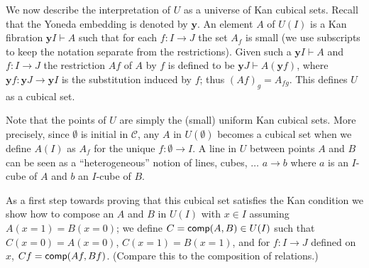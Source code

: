 \documentclass[10pt,a4paper]{article}
\newcommand{\CC}{{\mathcal C}}
\newcommand{\comp}{{\sf comp}}
\newcommand{\es}{\emptyset}
\newcommand{\rup}[1]{#1{\uparrow}}
\newcommand{\rdo}[1]{#1{\downarrow}}
\newcommand{\OO}{O}
\newcommand{\yoneda}{\mathbf{y}}
\begin{document}

We now describe the interpretation of $U$ as a universe of Kan cubical
sets. Recall that the Yoneda embedding is denoted by $\yoneda$.  An
element $A$ of $U(I)$ is a Kan fibration $\yoneda I \vdash A$ such
that for each $f \colon I \to J$ the set $A_f$ is small (we use
subscripts to keep the notation separate from the restrictions).
Given such a $\yoneda I \vdash A$ and $f \colon I \to J$ the
restriction $A f$ of $A$ by $f$ is defined to be $\yoneda J \vdash A
(\yoneda f)$, where $\yoneda f \colon \yoneda J \to \yoneda I$ is the
substitution induced by $f$; thus $(A f)_g = A_{f g}$.  This defines
$U$ as a cubical set.


Note that the points of $U$ are simply the (small) uniform Kan cubical
sets. More precisely, since $\es$ is initial in $\CC$,
any $A$ in $U(\es)$ becomes a cubical set when we define
$A(I)$ as $A_f$ for the unique $f:\es\to I$.
 A line in $U$ between points $A$ and $B$ can be seen as a
``heterogeneous'' notion of lines, cubes, $\dots$ $a\to b$
where $a$ is an $I$-cube of $A$ and $b$ an $I$-cube of $B$.

As a first step towards proving that this cubical set satisfies the
Kan condition we show how to compose an $A$ and $B$ in $U(I)$ with $x
\in I$ assuming $A (x=1) = B(x=0)$; we define $C = \comp(A,B) \in U
(I)$ such that $C (x=0) = A (x=0)$, $C(x=1) = B(x=1)$, and for $f
\colon I \to J$ defined on $x$, $C f = \comp (Af, Bf)$.  (Compare this
to the composition of relations.)
\end{document}
